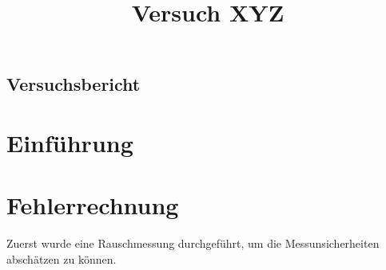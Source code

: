\documentclass[]{article}
\title{Versuch XYZ}
\begin{document}
	\begin{center}
		\section*{Versuchsbericht}
	\end{center}
\section{Einführung}
\section{Fehlerrechnung}
Zuerst wurde eine Rauschmessung durchgeführt, um die Messunsicherheiten abschätzen zu können.
\end{document}
